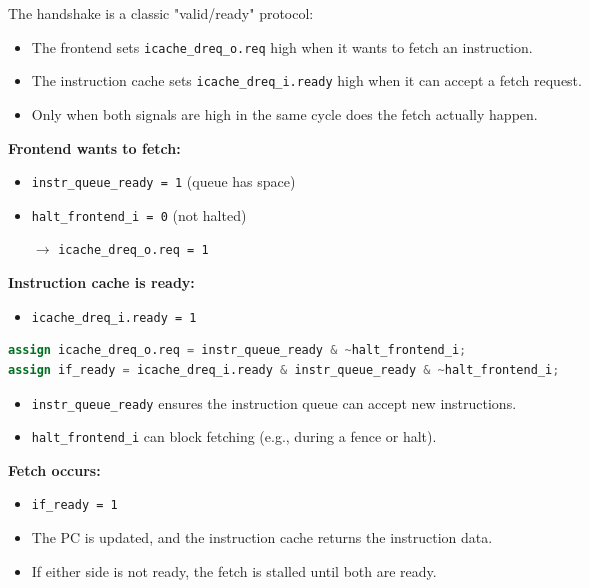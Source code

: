 \documentclass[12pt, a4paper]{article}
\begin{document}
\vspace{0.5em}

The handshake is a classic "valid/ready" protocol:
\begin{itemize}[nosep]
    \item The frontend sets \texttt{icache\_dreq\_o.req} high when it wants to fetch an instruction.
    \item The instruction cache sets \texttt{icache\_dreq\_i.ready} high when it can accept a fetch request.
    \item Only when both signals are high in the same cycle does the fetch actually happen.
\end{itemize}


\textbf{Frontend wants to fetch:}
\begin{itemize}[nosep]
    \item \texttt{instr\_queue\_ready = 1} (queue has space)
    \item \texttt{halt\_frontend\_i = 0} (not halted)
    \item[$\rightarrow$] \texttt{icache\_dreq\_o.req = 1}
\end{itemize}

\textbf{Instruction cache is ready:}
\begin{itemize}[nosep]
    \item \texttt{icache\_dreq\_i.ready = 1}
\end{itemize}

\begin{lstlisting}[language=Verilog, frame=single, basicstyle=\ttfamily\footnotesize, numbers = none]
assign icache_dreq_o.req = instr_queue_ready & ~halt_frontend_i;
assign if_ready = icache_dreq_i.ready & instr_queue_ready & ~halt_frontend_i;
\end{lstlisting}

\begin{itemize}[nosep]
    \item \texttt{instr\_queue\_ready} ensures the instruction queue can accept new instructions.
    \item \texttt{halt\_frontend\_i} can block fetching (e.g., during a fence or halt).
\end{itemize}

\textbf{Fetch occurs:}
\begin{itemize}[nosep]
    \item \texttt{if\_ready = 1}
    \item The PC is updated, and the instruction cache returns the instruction data.
    \item If either side is not ready, the fetch is stalled until both are ready.
\end{itemize}
\end{document}
